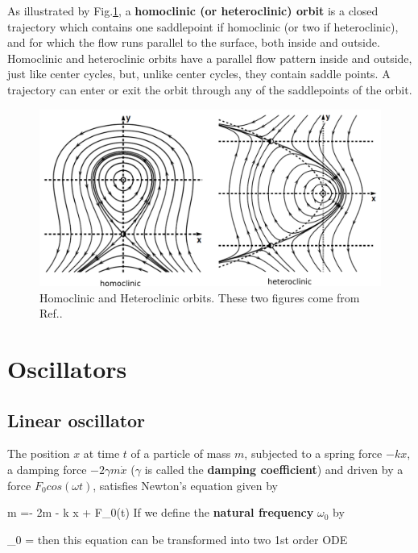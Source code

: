 As illustrated by Fig.\ref{fig-homo-hetero-clinic}, 
a {\bf homoclinic (or heteroclinic) orbit}  is a closed trajectory which contains one saddlepoint if homoclinic (or two if heteroclinic), and for which the flow runs
parallel to the surface, both inside and outside. 
Homoclinic and heteroclinic orbits have a parallel
flow pattern inside and outside, just like center cycles, but,
unlike center cycles,  they contain saddle points. 
A trajectory can enter or exit the orbit through any of the saddlepoints of the orbit.

\begin{figure}[h!]
\centering
\includegraphics[width=6in]
{dynamical-sys/homo-hetero-clinic.png}
\caption{Homoclinic and Heteroclinic orbits.
These two
 figures  come from Ref.\cite{dynamical-fuchs}.}
\label{fig-homo-hetero-clinic}
\end{figure}


\section{Oscillators}

\subsection{Linear oscillator}

The position $x$ 
at time $t$ of a particle of mass $m$, subjected 
to a spring force $-k x$,
a 
damping force $-2\gamma m \dot{x}$
($\gamma$ is called the {\bf damping coefficient})
and driven by a force $F_0cos(\omega t)$,
satisfies Newton's equation given by

\beq
m =- 2\gamma m  - 
k x + F_0\cos(\omega t)
\label{eq-ho}
\eeq
If we define the {\bf natural frequency}  $\omega_0$ by

\beq
\omega_0 = 
\eeq
then this equation can be transformed into two 1st order ODE

